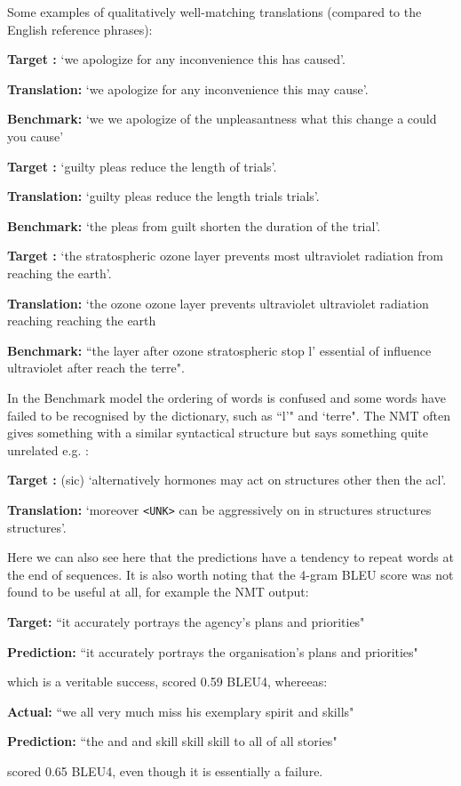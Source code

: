 \documentclass[]{article}
\begin{document}
Some examples of qualitatively well-matching translations (compared to the English reference phrases):
\begin{center}
	\textbf{Target :} `we apologize for any inconvenience this has caused'.
	
	\textbf{Translation:} `we apologize for any inconvenience this may cause'.
	
	\textbf{Benchmark:} `we we apologize of the unpleasantness what this change a could you cause'
\end{center}
\begin{center}
	\textbf{Target :} `guilty pleas reduce the length of trials'.
	
	\textbf{Translation:} `guilty pleas reduce the length trials trials'.
	
	\textbf{Benchmark:} `the pleas from guilt shorten the duration of the trial'.
\end{center}
\begin{center}
	\textbf{Target :} `the stratospheric ozone layer prevents most ultraviolet radiation from reaching the earth'.
	
	\textbf{Translation:} `the ozone ozone layer prevents ultraviolet ultraviolet radiation reaching reaching the earth
	
	\textbf{Benchmark:} ``the layer after ozone stratospheric stop l' essential of influence ultraviolet after reach the terre".
\end{center}
In the Benchmark model the ordering of words is confused and some words have failed to be recognised by the dictionary, such as ``l'" and `terre".
The NMT often gives something with a similar syntactical structure but says something quite unrelated e.g. :
\begin{center}
	\textbf{Target :} (sic) `alternatively hormones may act on structures other then the acl'.
	
	\textbf{Translation:} `moreover \lstinline{<UNK>} can be aggressively on in structures structures structures'.
\end{center}
Here we can also see here that the predictions have a tendency to repeat words at the end of sequences. It is also worth noting that the 4-gram BLEU score was not found to be useful at all, for example the NMT output: 
\begin{center}
	\textbf{Target:} ``it accurately portrays the agency's plans and priorities"
	
	\textbf{Prediction:} ``it accurately portrays the organisation's plans and priorities"
\end{center}
which is a veritable success, scored 0.59 BLEU4, whereeas:
\begin{center}
	\textbf{Actual:} ``we all very much miss his exemplary spirit and skills"
	
	\textbf{Prediction:} ``the and and skill skill skill to all of all stories"
\end{center}
scored 0.65 BLEU4, even though it is essentially a failure.
\end{document}

